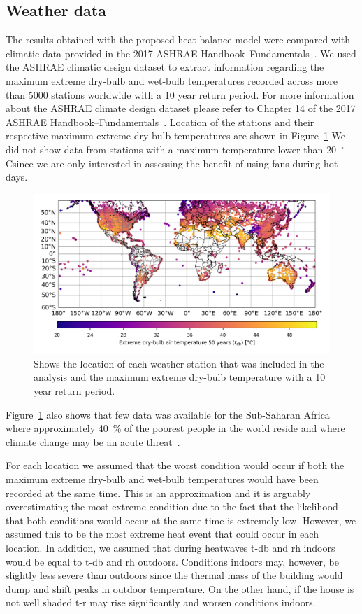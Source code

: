 \subsection{Weather data}\label{subsec:weather-data}

The results obtained with the proposed heat balance model were compared with climatic data provided in the 2017 ASHRAE Handbook--Fundamentals~\cite{ASHRA2017}.
We used the ASHRAE climatic design dataset to extract information regarding the maximum extreme dry-bulb and wet-bulb temperatures recorded across more than 5000 stations worldwide with a 10 year return period.
For more information about the ASHRAE climate design dataset please refer to Chapter 14 of the 2017 ASHRAE Handbook--Fundamentals~\cite{ASHRA2017}.
Location of the stations and their respective maximum extreme dry-bulb temperatures are shown in Figure~\ref{fig:world-map}
We did not show data from stations with a maximum temperature lower than 20~$^\circ$C\@ since we are only interested in assessing the benefit of using fans during hot days.

\begin{figure}[thb!]
    \centering
    \includegraphics[width=\textwidth]{figures/world-map.png}
    \caption{Shows the location of each weather station that was included in the analysis and the maximum extreme dry-bulb temperature with a 10 year return period.}
    \label{fig:world-map}
\end{figure}

Figure~\ref{fig:world-map} also shows that few data was available for the Sub-Saharan Africa where approximately 40~\% of the poorest people in the world reside and where climate change may be an acute threat~\cite{PovertyO1:online}.

For each location we assumed that the worst condition would occur if both the maximum extreme dry-bulb and wet-bulb temperatures would have been recorded at the same time.
This is an approximation and it is arguably overestimating the most extreme condition due to the fact that the likelihood that both conditions would occur at the same time is extremely low.
However, we assumed this to be the most extreme heat event that could occur in each location.
In addition, we assumed that during heatwaves \ac{t-db} and \ac{rh} indoors would be equal to \ac{t-db} and \ac{rh} outdoors.
Conditions indoors may, however, be slightly less severe than outdoors since the thermal mass of the building would dump and shift peaks in outdoor temperature.
On the other hand, if the house is not well shaded \ac{t-r} may rise significantly and worsen conditions indoors.

